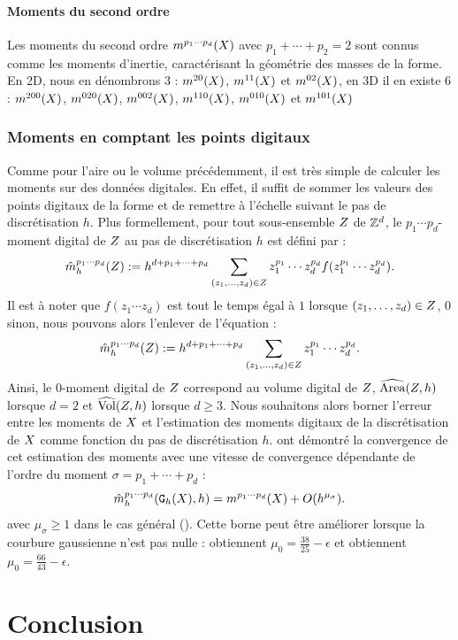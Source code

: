 \paragraph{Moments du second ordre}
%
Les moments du second ordre $\Mom{p_1 \cdots p_d}(\Shape)$ avec $p_1 + \cdots +
p_2 = 2$ sont connus comme les moments d'inertie, caractérisant la géométrie des
masses de la forme. En 2D, nous en dénombrons 3 : $\Mom{2 0}(\Shape)$, $\Mom{1
1}(\Shape)$ et $\Mom{0 2}(\Shape)$, en 3D il en existe 6 :  $\Mom{2 0
0}(\Shape)$, $\Mom{0 2 0}(\Shape)$, $\Mom{0 0 2}(\Shape)$, $\Mom{1 1
0}(\Shape)$, $\Mom{0 1 0}(\Shape)$ et $\Mom{1 0 1}(\Shape)$
%
\subsubsection{Moments en comptant les points digitaux}
\label{sec:MomentsByCounting}
%
Comme pour l'aire ou le volume précédemment, il est très simple de calculer les
moments sur des données digitales. En effet, il suffit de sommer les valeurs des
points digitaux de la forme et de remettre à l'échelle suivant le pas de
discrétisation $h$. Plus formellement, pour tout sous-ensemble $\DigShape$ de
$\Z^d$, le $p_1 \cdots p_d$-moment digital de $\DigShape$ au pas de
discrétisation $h$ est défini par :
%
\begin{equation}
  \DMom{p_1 \cdots p_d}{h}(\DigShape) \EqDef h^{d + p_1 + \cdots + p_d} \sum_{(z_1,\ldots,z_d) \in \DigShape} z_1^{p_1} \cdots z_d^{p_d} f(z_1^{p_1} \cdots z_d^{p_d}).
\end{equation}
%
Il est à noter que $f(z_1 \cdots z_d)$ est tout le temps égal à $1$ lorsque
$(z_1,\ldots,z_d) \in \DigShape$, $0$ sinon, nous pouvons alors l'enlever de
l'équation :
%
\begin{equation} \label{eq:MomentsByCounting-def}
%
  \DMom{p_1 \cdots p_d}{h}(\DigShape) \EqDef h^{d + p_1 + \cdots + p_d} \sum_{(z_1,\ldots,z_d) \in \DigShape} z_1^{p_1} \cdots z_d^{p_d}.
%
\end{equation}
%
Ainsi, le $0$-moment digital de $\DigShape$ correspond au volume digital de
$\DigShape$, \cad $\AreaC(\DigShape,h)$ lorsque $d = 2$ et $\VolC(\DigShape,h)$
lorsque $d \geq 3$.
%
Nous souhaitons alors borner l'erreur entre les moments de $\Shape$ et
l'estimation des moments digitaux de la discrétisation de $\Shape$ comme
fonction du pas de discrétisation $h$.  ont
démontré la convergence de cet estimation des moments avec une vitesse de
convergence dépendante de l'ordre du moment $\sigma = p_1 + \cdots + p_d$ :
%
\begin{equation} \label{eq:MomentsByCounting-conv}
%
  \DMom{p_1 \cdots p_d}{h}(\DigF{\Shape}{h},h) = \Mom{p_1 \cdots p_d}(\Shape) + O(h^{\mu_{\sigma}}).
%
\end{equation}
%
avec $\mu_{\sigma} \ge 1$ dans le cas général (). Cette
borne peut être améliorer lorsque la courbure gaussienne n'est pas nulle :
 obtiennent $\mu_0=\frac{38}{25}-\epsilon$ et
 obtiennent $\mu_0 = \frac{66}{43}-\epsilon$.
%
%
\section{Conclusion}
%
